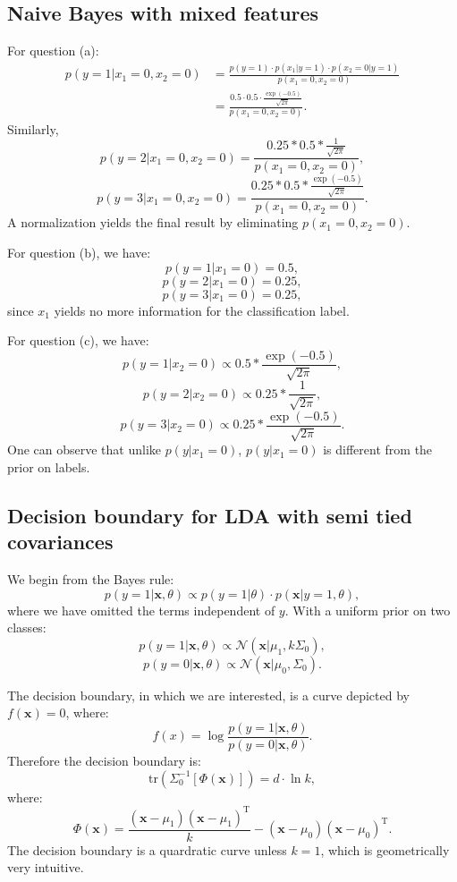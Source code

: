\documentclass[UTF8]{ctexart}
\begin{document}
\subsection{Naive Bayes with mixed features}
For question (a):
$$
\begin{aligned}
p(y=1|x_{1}=0,x_{2}=0)&=\frac{p(y=1)\cdot p(x_{1}|y=1)\cdot p(x_{2}=0|y=1)}{p(x_{1}=0,x_{2}=0)}\\
&=\frac{0.5\cdot 0.5 \cdot \frac{\exp(-0.5)}{\sqrt{2\pi}}}{p(x_{1}=0,x_{2}=0)}.
\end{aligned}
$$
Similarly,
$$p(y=2|x_{1}=0,x_{2}=0)=\frac{0.25*0.5*\frac{1}{\sqrt{2\pi}}}{p(x_{1}=0,x_{2}=0)},$$
$$p(y=3|x_{1}=0,x_{2}=0)=\frac{0.25*0.5*\frac{\exp(-0.5)}{\sqrt{2\pi}}}{p(x_{1}=0,x_{2}=0)}.$$
A normalization yields the final result by eliminating $p(x_{1}=0,x_{2}=0)$.

For question (b), we have:
$$p(y=1|x_{1}=0)=0.5,$$
$$p(y=2|x_{1}=0)=0.25,$$
$$p(y=3|x_{1}=0)=0.25,$$
since $x_{1}$ yields no more information for the classification label.

For question (c), we have:
$$p(y=1|x_{2}=0)\propto 0.5*\frac{\exp(-0.5)}{\sqrt{2\pi}},$$
$$p(y=2|x_{2}=0)\propto 0.25*\frac{1}{\sqrt{2\pi}},$$
$$p(y=3|x_{2}=0)\propto 0.25*\frac{\exp(-0.5)}{\sqrt{2\pi}}.$$
One can observe that unlike $p(y|x_{1}=0)$, $p(y|x_{1}=0)$ is different from the prior on labels.


\subsection{Decision boundary for LDA with semi tied covariances}
We begin from the Bayes rule:
$$p(y=1|\textbf{x},\theta) \propto p(y=1|\theta)\cdot p(\textbf{x}|y=1,\theta),$$
where we have omitted the terms independent of $y$.
With a uniform prior on two classes:
$$p(y=1|\textbf{x},\theta) \propto \mathcal{N}(\textbf{x}|\mu_{1},k\Sigma_{0}),$$
$$p(y=0|\textbf{x},\theta) \propto \mathcal{N}(\textbf{x}|\mu_{0},\Sigma_{0}).$$

The decision boundary, in which we are interested, is a curve depicted by $f(\textbf{x})=0$, where:
$$f(x)=\log \frac{p(y=1|\textbf{x},\theta)}{p(y=0|\textbf{x},\theta)}.$$
Therefore the decision boundary is:
$$\text{tr}\left(\Sigma^{-1}_{0}\left[\Phi(\textbf{x}) \right] \right)=d\cdot \ln k,$$
where:
$$\Phi(\textbf{x})=\frac{(\textbf{x}-\mu_{1})(\textbf{x}-\mu_{1})^{\text{T}}}{k}-(\textbf{x}-\mu_{0})(\textbf{x}-\mu_{0})^{\text{T}}.$$
The decision boundary is a quardratic curve unless $k=1$, which is geometrically very intuitive.
\end{document}
